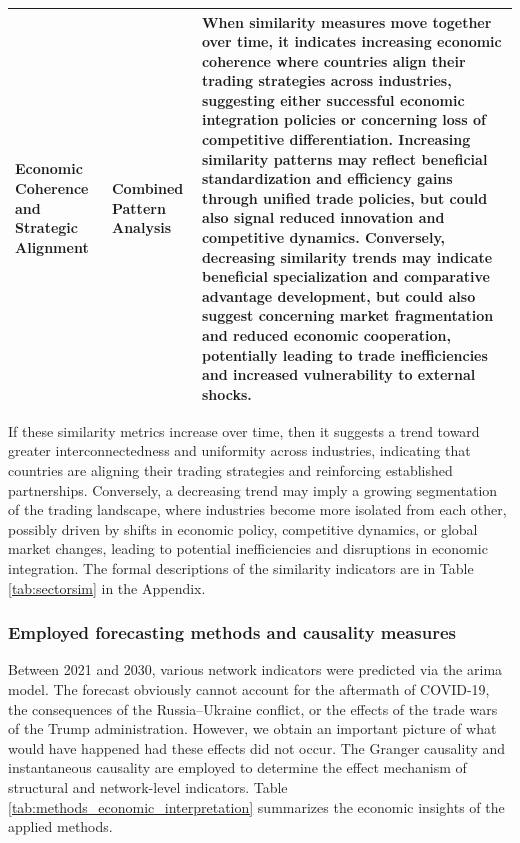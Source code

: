 \documentclass[preprint, 3p,
authoryear]{elsarticle} %
\begin{document}
\begin{table}[htbp]
\begin{tabular}{p{} p{} p{}}
\textbf{Economic Coherence and Strategic Alignment} & 
Combined Pattern Analysis & 
When similarity measures move together over time, it indicates increasing economic coherence where countries align their trading strategies across industries, suggesting either successful economic integration policies or concerning loss of competitive differentiation. Increasing similarity patterns may reflect beneficial standardization and efficiency gains through unified trade policies, but could also signal reduced innovation and competitive dynamics. Conversely, decreasing similarity trends may indicate beneficial specialization and comparative advantage development, but could also suggest concerning market fragmentation and reduced economic cooperation, potentially leading to trade inefficiencies and increased vulnerability to external shocks. \\
\hline
\end{tabular}
\label{tab:similarity_indicators_economic}
\end{table}

If these similarity metrics increase over time, then it suggests a trend
toward greater interconnectedness and uniformity across industries,
indicating that countries are aligning their trading strategies and
reinforcing established partnerships. Conversely, a decreasing trend may
imply a growing segmentation of the trading landscape, where industries
become more isolated from each other, possibly driven by shifts in
economic policy, competitive dynamics, or global market changes, leading
to potential inefficiencies and disruptions in economic integration. The
formal descriptions of the similarity indicators are in Table
\ref{tab:sectorsim} in the Appendix.

\subsubsection{Employed forecasting methods and causality
measures}\label{sec:methodcaus}

Between 2021 and 2030, various network indicators were predicted via the
\gls{arima} model. The forecast obviously cannot account for the
aftermath of COVID-19, the consequences of the Russia--Ukraine conflict,
or the effects of the trade wars of the Trump administration. However,
we obtain an important picture of what would have happened had these
effects did not occur. The Granger causality and instantaneous causality
are employed to determine the effect mechanism of structural and
network-level indicators. Table
\ref{tab:methods_economic_interpretation} summarizes the economic
insights of the applied methods.
\end{document}
